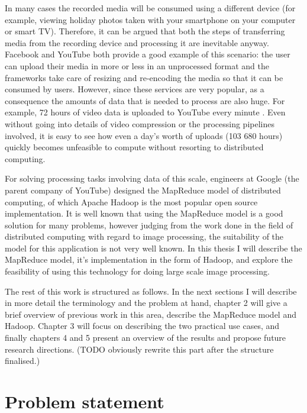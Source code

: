 \documentclass [12pt,a4paper]{report}
\begin{document}
In many cases the recorded media will be consumed using a different device (for example, viewing holiday photos taken with your smartphone on your computer or smart TV). Therefore, it can be argued that both the steps of transferring media from the recording device and processing it are inevitable anyway. Facebook and YouTube both provide a good example of this scenario: the user can upload their media in more or less in an unprocessed format and the frameworks take care of resizing and re-encoding the media so that it can be consumed by users. However, since these services are very popular, as a consequence the amounts of data that is needed to process are also huge. For example, 72 hours of video data is uploaded to YouTube every minute \cite{youtube_stats}. Even without going into details of video compression or the processing pipelines involved, it is easy to see how even a day's worth of uploads (103 680 hours) quickly becomes unfeasible to compute without resorting to distributed computing.

For solving processing tasks involving data of this scale, engineers at Google (the parent company of YouTube) designed the MapReduce model of distributed computing, of which Apache Hadoop is the most popular open source implementation. It is well known that using the MapReduce model is a good solution for many problems, however judging from the work done in the field of distributed computing with regard to image processing, the suitability of the model for this application is not very well known. In this thesis I will describe the MapReduce model, it's implementation in the form of Hadoop, and explore the feasibility of using this technology for doing large scale image processing.

The rest of this work is structured as follows. In the next sections I will describe in more detail the terminology and the problem at hand, chapter 2 will give a brief overview of previous work in this area, describe the MapReduce model and Hadoop. Chapter 3 will focus on describing the two practical use cases, and finally chapters 4 and 5 present an overview of the results and propose future research directions. (TODO obviously rewrite this part after the structure finalised.) %

\section{Problem statement}
\end{document}
